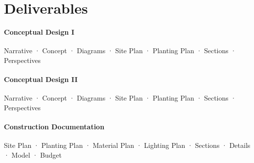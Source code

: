 \documentclass[11pt,article,oneside]{memoir}
\begin{document}

\section{Deliverables}

\paragraph{Conceptual Design I}
Narrative · Concept · Diagrams · Site Plan · Planting Plan · Sections · Perspectives

\paragraph{Conceptual Design II}
Narrative · Concept · Diagrams · Site Plan · Planting Plan · Sections · Perspectives

\paragraph{Construction Documentation}
Site Plan · Planting Plan · Material Plan · Lighting Plan · Sections · Details · Model · Budget








\end{document}

